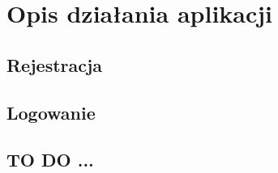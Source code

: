 \chapter{Opis działania aplikacji}
\label{cha:opisDzialaniaAplikacji}

\section{Rejestracja}
\label{sec:rejestracja}

\section{Logowanie}
\label{sec:logowanie}

\section{TO DO ...}
